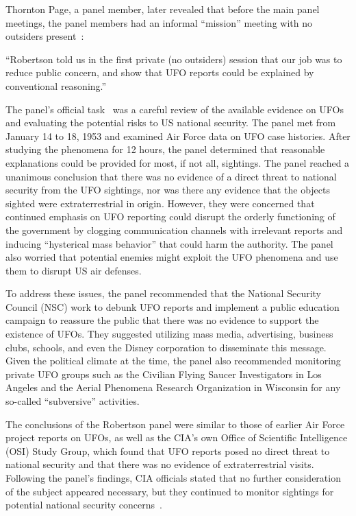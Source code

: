 Thornton Page, a panel member, later revealed that before the main panel meetings, the panel members had an informal ``mission'' meeting with no outsiders present~\cite{Page1992}:
\begin{svgraybox}
``Robertson told us in the first private (no outsiders) session that our job was to reduce public concern,
and show that UFO reports could be explained by conventional reasoning.''
\end{svgraybox}
The panel's official task~\cite{Haines-CIA-UFO} was a careful review of the available evidence on UFOs and evaluating the potential risks to US national security.
The panel met from January 14 to 18, 1953 and examined Air Force data on UFO case histories.
After studying the phenomena for 12 hours, the panel determined that reasonable explanations could be provided for most,
if not all, sightings.
The panel reached a unanimous conclusion that there was no evidence of a direct threat to national security from the UFO sightings,
nor was there any evidence that the objects sighted were extraterrestrial in origin. However, they were concerned that continued emphasis on UFO reporting could disrupt the orderly functioning of the government by clogging communication channels with irrelevant reports and inducing ``hysterical mass behavior'' that could harm the authority.
The panel also worried that potential enemies might exploit the UFO phenomena and use them to disrupt US air defenses.

To address these issues, the panel recommended that the National Security Council (NSC) work to debunk UFO reports
and implement a public education campaign to reassure the public that there was no evidence to support the existence of UFOs.
They suggested utilizing mass media, advertising, business clubs, schools, and even the Disney corporation to disseminate this message.
Given the political climate at the time, the panel also recommended monitoring
private UFO groups such as the Civilian Flying Saucer Investigators in Los Angeles and the
Aerial Phenomena Research Organization in Wisconsin for any so-called ``subversive'' activities.

The conclusions of the Robertson panel were similar to those of earlier Air Force project reports on UFOs,
as well as the CIA's own Office of Scientific Intelligence (OSI) Study Group, which found that UFO reports posed no direct threat to national security
and that there was no evidence of extraterrestrial visits.
Following the panel's findings, CIA officials stated that no further consideration of the subject appeared necessary,
but they continued to monitor sightings for potential national security concerns~\cite{RobertsonPanelDurantReport}.

